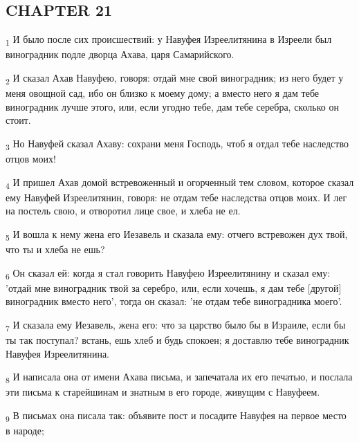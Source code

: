 \subsection{CHAPTER 21}
\begin{tcolorbox}
\textsubscript{1} И было после сих происшествий: у Навуфея Изреелитянина в Изреели был виноградник подле дворца Ахава, царя Самарийского.
\end{tcolorbox}
\begin{tcolorbox}
\textsubscript{2} И сказал Ахав Навуфею, говоря: отдай мне свой виноградник; из него будет у меня овощной сад, ибо он близко к моему дому; а вместо него я дам тебе виноградник лучше этого, или, если угодно тебе, дам тебе серебра, сколько он стоит.
\end{tcolorbox}
\begin{tcolorbox}
\textsubscript{3} Но Навуфей сказал Ахаву: сохрани меня Господь, чтоб я отдал тебе наследство отцов моих!
\end{tcolorbox}
\begin{tcolorbox}
\textsubscript{4} И пришел Ахав домой встревоженный и огорченный тем словом, которое сказал ему Навуфей Изреелитянин, говоря: не отдам тебе наследства отцов моих. И лег на постель свою, и отворотил лице свое, и хлеба не ел.
\end{tcolorbox}
\begin{tcolorbox}
\textsubscript{5} И вошла к нему жена его Иезавель и сказала ему: отчего встревожен дух твой, что ты и хлеба не ешь?
\end{tcolorbox}
\begin{tcolorbox}
\textsubscript{6} Он сказал ей: когда я стал говорить Навуфею Изреелитянину и сказал ему: 'отдай мне виноградник твой за серебро, или, если хочешь, я дам тебе [другой] виноградник вместо него', тогда он сказал: 'не отдам тебе виноградника моего'.
\end{tcolorbox}
\begin{tcolorbox}
\textsubscript{7} И сказала ему Иезавель, жена его: что за царство было бы в Израиле, если бы ты так поступал? встань, ешь хлеб и будь спокоен; я доставлю тебе виноградник Навуфея Изреелитянина.
\end{tcolorbox}
\begin{tcolorbox}
\textsubscript{8} И написала она от имени Ахава письма, и запечатала их его печатью, и послала эти письма к старейшинам и знатным в его городе, живущим с Навуфеем.
\end{tcolorbox}
\begin{tcolorbox}
\textsubscript{9} В письмах она писала так: объявите пост и посадите Навуфея на первое место в народе;
\end{tcolorbox}

